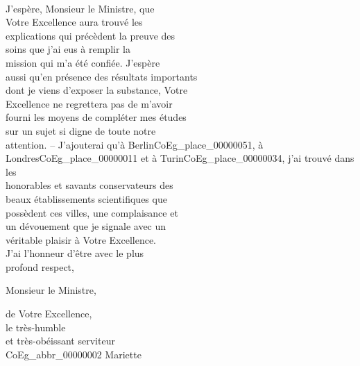 \documentclass{book}
\begin{document}
{\begin{paracol}{2}
\noindent \\
\switchcolumn
J’espère, Monsieur le Ministre, que\\
Votre Excellence aura trouvé les\\
explications qui précèdent la preuve des\\
soins que j’ai eus à remplir la\\
mission qui m’a été confiée. J’espère\\
aussi qu’en présence des résultats importants\\
dont je viens d’exposer la substance, Votre\\
Excellence ne regrettera pas de m’avoir\\
fourni les moyens de compléter mes études\\
sur un sujet si digne de toute notre\\
attention. – J’ajouterai qu’à Berlin\gls{CoEg_place_00000051}, à\\
Londres\gls{CoEg_place_00000011} et à Turin\gls{CoEg_place_00000034}, j’ai trouvé dans les\\
honorables et savants conservateurs des\\
beaux établissements scientifiques que\\
possèdent ces villes, une complaisance et\\
un dévouement que je signale avec un\\
véritable plaisir à Votre Excellence.\\
\indent J’ai l’honneur d’être avec le plus\\
profond respect,
\begin{center}Monsieur le Ministre,\end{center}
\begin{center}\hspace{3cm}de Votre Excellence,\\
\hspace{3cm}le très-humble\\
\hspace{3cm}et très-obéissant serviteur\\
\hspace{3cm}\gls{CoEg_abbr_00000002} Mariette\end{center}
\end{paracol}

\hypertarget{CoEg_Mariette_1857-08-26}{}

}
\end{document}
